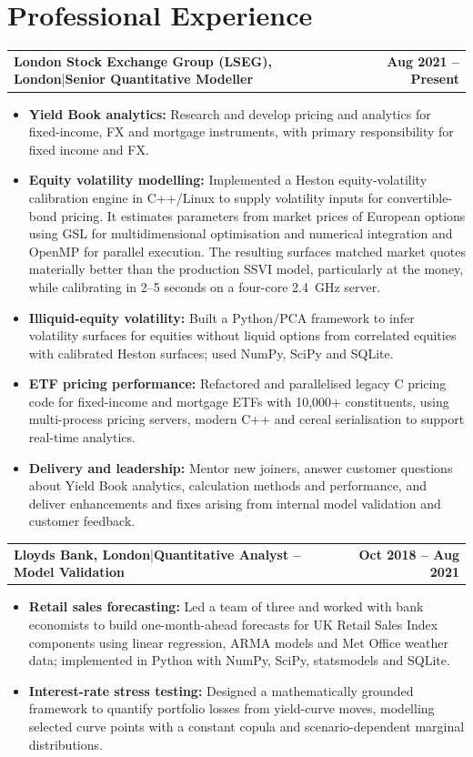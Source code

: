 \documentclass[10pt,a4paper]{article}
\makeatletter
\newcommand{\job}[4]{%
  \noindent\begin{tabularx}{\textwidth}{@{}X r@{}}
    \textbf{\color{Navy}#1, #2}\enspace|\enspace\textbf{#3} &
    \textbf{\color{Muted}#4}
  \end{tabularx}\vspace{-0.6ex}
}
\makeatother
\begin{document}
\section{Professional Experience}

\job{London Stock Exchange Group (LSEG)}{London}{Senior Quantitative
  Modeller}{Aug 2021 -- Present} 
\begin{itemize}
\item \textbf{Yield Book analytics:} Research and develop pricing and analytics
  for fixed-income, FX and mortgage instruments, with primary responsibility
  for fixed income and FX.
\item \textbf{Equity volatility modelling:} Implemented a Heston equity-volatility
  calibration engine in C++/Linux to supply volatility inputs for convertible-bond
  pricing. It estimates parameters from market prices of European options
  using GSL for multidimensional optimisation and numerical integration
  and OpenMP for parallel execution. The resulting surfaces matched
  market quotes materially better than the production SSVI model, particularly
  at the money, while calibrating in 2--5 seconds on a four-core 2.4~GHz
  server.
\item \textbf{Illiquid-equity volatility:} Built a Python/PCA framework
  to infer volatility surfaces for equities without liquid options from
  correlated equities with calibrated Heston surfaces; used NumPy, SciPy
  and SQLite.
\item \textbf{ETF pricing performance:} Refactored and parallelised
  legacy C pricing code for fixed-income and mortgage ETFs with
  10,000+ constituents, using multi-process pricing servers, modern
  C++ and cereal serialisation to support real-time analytics.
\item \textbf{Delivery and leadership:} Mentor new joiners, answer customer
  questions about Yield Book analytics, calculation methods and performance,
  and deliver enhancements and fixes arising from internal model
  validation and customer feedback.
\end{itemize}
\job{Lloyds Bank}{London}{Quantitative Analyst -- Model Validation}{Oct
  2018 -- Aug 2021} 
\begin{itemize}
\item \textbf{Retail sales forecasting:} Led a team of three and worked
  with bank economists to build one-month-ahead forecasts for UK Retail
  Sales Index components using linear regression, ARMA models and Met
  Office weather data; implemented in Python with NumPy, SciPy, statsmodels
  and SQLite.
\item \textbf{Interest-rate stress testing:} Designed a mathematically grounded
  framework to quantify portfolio losses from yield-curve moves, modelling
  selected curve points with a constant copula and scenario-dependent
  marginal distributions. 
\end{itemize}
\end{document}
